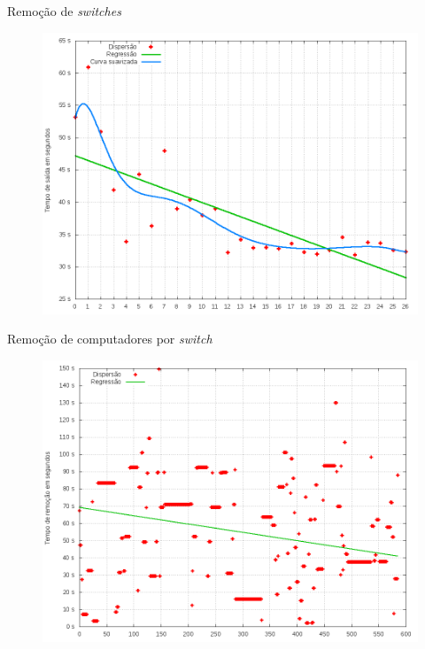 \begin{frame}{Remoção de \emph{switches}}

    \begin{figure}[!htb]
        \centering
        \includegraphics[scale=.35]{images/switch-leave-time}
    \end{figure}
\end{frame}


\begin{frame}{Remoção de computadores por \emph{switch}}

    \begin{figure}[!htb]
        \centering
        \includegraphics[scale=.35]{images/hosts-behind-switch-time}
    \end{figure}
\end{frame}


